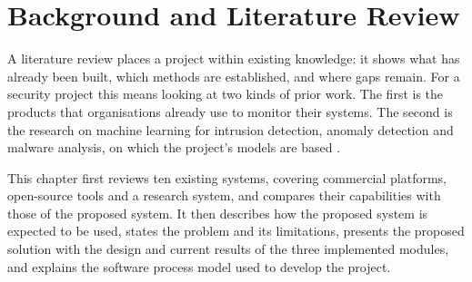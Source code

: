 \chapter{Background and Literature Review}

A literature review places a project within existing knowledge: it shows what has already been built, which methods are established, and where gaps remain. For a security project this means looking at two kinds of prior work. The first is the products that organisations already use to monitor their systems. The second is the research on machine learning for intrusion detection, anomaly detection and malware analysis, on which the project's models are based \cite{buczak2016survey,chandola2009anomaly,ucci2019malware}.

This chapter first reviews ten existing systems, covering commercial platforms, open-source tools and a research system, and compares their capabilities with those of the proposed system. It then describes how the proposed system is expected to be used, states the problem and its limitations, presents the proposed solution with the design and current results of the three implemented modules, and explains the software process model used to develop the project.
